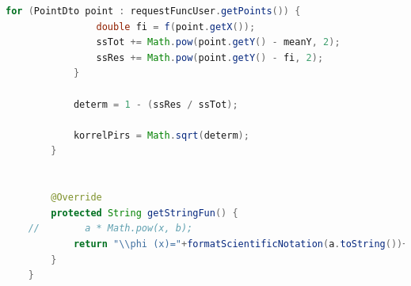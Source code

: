 \documentclass{article}
\begin{document}
\begin{lstlisting}[language=Java, caption={Степенная аппроксимация}]
            for (PointDto point : requestFuncUser.getPoints()) {
                double fi = f(point.getX());
                ssTot += Math.pow(point.getY() - meanY, 2);
                ssRes += Math.pow(point.getY() - fi, 2);
            }
    
            determ = 1 - (ssRes / ssTot);
    
            korrelPirs = Math.sqrt(determ);
        }

    
        @Override
        protected String getStringFun() {
    //        a * Math.pow(x, b);
            return "\\phi (x)="+formatScientificNotation(a.toString())+"\\cdot x^{"+formatScientificNotation(b.toString())+"}";
        }
    }
    
    
\end{lstlisting}
\end{document}
